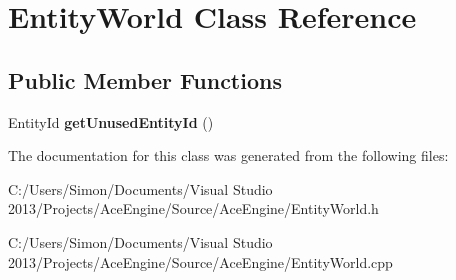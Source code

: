 \hypertarget{class_entity_world}{}\section{Entity\+World Class Reference}
\label{class_entity_world}
\subsection*{Public Member Functions}
\begin{DoxyCompactItemize}
\item 
\hypertarget{class_entity_world_ad0d89c5df1c32e4493ed1da216c97362}{}Entity\+Id {\bfseries get\+Unused\+Entity\+Id} ()\label{class_entity_world_ad0d89c5df1c32e4493ed1da216c97362}

\end{DoxyCompactItemize}


The documentation for this class was generated from the following files\+:\begin{DoxyCompactItemize}
\item 
C\+:/\+Users/\+Simon/\+Documents/\+Visual Studio 2013/\+Projects/\+Ace\+Engine/\+Source/\+Ace\+Engine/Entity\+World.\+h\item 
C\+:/\+Users/\+Simon/\+Documents/\+Visual Studio 2013/\+Projects/\+Ace\+Engine/\+Source/\+Ace\+Engine/Entity\+World.\+cpp\end{DoxyCompactItemize}
